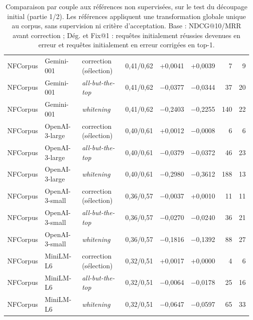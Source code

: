 \documentclass[a4paper,10pt]{article}
\begin{document}
\begin{table}[p]
\begin{tabular}{lllcrrrr}
NFCorpus & Gemini-001 & correction (sélection) & 0,41/0,62 & +0,0041 & +0,0039 & 7 & 9 \\
NFCorpus & Gemini-001 & \textit{all-but-the-top} & 0,41/0,62 & $-$0,0377 & $-$0,0344 & 37 & 20 \\
NFCorpus & Gemini-001 & \textit{whitening} & 0,41/0,62 & $-$0,2403 & $-$0,2255 & 140 & 22 \\
NFCorpus & OpenAI-3-large & correction (sélection) & 0,40/0,61 & +0,0012 & $-$0,0008 & 6 & 6 \\
NFCorpus & OpenAI-3-large & \textit{all-but-the-top} & 0,40/0,61 & $-$0,0379 & $-$0,0372 & 46 & 23 \\
NFCorpus & OpenAI-3-large & \textit{whitening} & 0,40/0,61 & $-$0,2980 & $-$0,3612 & 188 & 13 \\
NFCorpus & OpenAI-3-small & correction (sélection) & 0,36/0,57 & $-$0,0037 & +0,0010 & 11 & 11 \\
NFCorpus & OpenAI-3-small & \textit{all-but-the-top} & 0,36/0,57 & $-$0,0270 & $-$0,0240 & 36 & 21 \\
NFCorpus & OpenAI-3-small & \textit{whitening} & 0,36/0,57 & $-$0,1816 & $-$0,1392 & 88 & 27 \\
NFCorpus & MiniLM-L6 & correction (sélection) & 0,32/0,51 & +0,0017 & +0,0000 & 4 & 6 \\
NFCorpus & MiniLM-L6 & \textit{all-but-the-top} & 0,32/0,51 & $-$0,0064 & $-$0,0178 & 25 & 16 \\
NFCorpus & MiniLM-L6 & \textit{whitening} & 0,32/0,51 & $-$0,0647 & $-$0,0597 & 65 & 33 \\
\bottomrule
\end{tabular}
\caption{Comparaison par couple aux références non supervisées, sur le test du découpage initial (partie 1/2). Les références appliquent une transformation globale unique au corpus, sans supervision ni critère d'acceptation. Base : NDCG@10/MRR avant correction ; Dég. et Fix@1 : requêtes initialement réussies devenues en erreur et requêtes initialement en erreur corrigées en top-1.}
\label{tab:s-references-couples-1}
\end{table}
\end{document}
